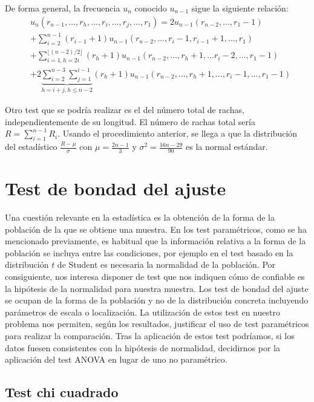 	De forma general, la frecuencia $u_n$ conocido $u_{n-1}$ 
sigue la siguiente relación:
\begin{align*}
	& u_n (r_{n-1}, \dots, r_h, \dots, r_i, \dots, r_j, 
			\dots, r_1)= 
		2 u_{n-1}(r_{n-2}, \dots, r_1-1) \\
	&+ \sum\limits_{i=2}^{n-1} 
		(r_{i-1} + 1)
		u_{n-1}(r_{n-2},\dots, r_i-1, r_{i-1}+1,\dots, r_1)\\
	&+ \sum\limits_{i=1, h=2i}^{\lfloor (n-2)/2 \rfloor} 
		(r_{h} + 1)
		u_{n-1}(r_{n-2},\dots, r_h+1,\dots r_i-2,
				\dots, r_1-1)\\
	&+ 2 \underbrace{\sum\limits_{i=2}^{n-3} 
		\sum\limits_{j=1}^{i-1}}_{h=i+j, h \leq n-2}
		(r_{h} + 1)
		u_{n-1}(r_{n-2},\dots, r_h+1,\dots, r_i-1,
				\dots, r_1-1)			
\end{align*}
	
	Otro test que se podría realizar es el del número total 
de rachas, independientemente de su longitud. El número de 
rachas total sería $R = \sum\limits_{i=1}^{n-1} R_i$. Usando 
el procedimiento anterior, se llega a que la distribución 
del estadístico $\frac{R-\mu}{\sigma}$ con $\mu = 
\frac{2n-1}{3}$ y $\sigma^2=\frac{16n-29}{90}$ es la 
normal estándar.
	
\section{Test de bondad del ajuste}

	Una cuestión relevante en la estadística es la obtención 
de la forma de la población de la que se obtiene una muestra. 
En los test paramétricos, como se ha mencionado previamente, 
es habitual que la información relativa a la forma de la 
población se incluya entre las condiciones, por ejemplo en el 
test basado en la distribución $t$ de Student es necesaria la 
normalidad de la población. Por consiguiente, nos interesa 
disponer de test que nos indiquen cómo de confiable es la 
hipótesis de la normalidad para nuestra muestra. Los test de 
bondad del ajuste se ocupan de la forma de la población y no 
de la distribución concreta incluyendo parámetros de escala o 
localización. La utilización de estos test en nuestro problema
nos permiten, según los resultados, justificar el
uso de test paramétricos para realizar la comparación. Tras
la aplicación de estos test podríamos, si los datos
fuesen consistentes con la hipótesis de normalidad,
decidirnos por la aplicación del test ANOVA en lugar
de uno no paramétrico.
	
\subsection{Test chi cuadrado}

